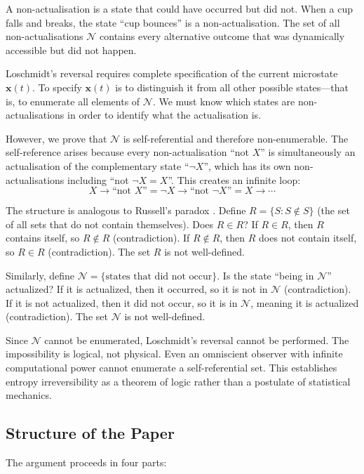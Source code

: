 \documentclass[twocolumn,10pt]{article}
\theoremstyle{definition}
\theoremstyle{remark}
\begin{document}
A non-actualisation is a state that could have occurred but did not. When a cup falls and breaks, the state ``cup bounces'' is a non-actualisation. The set of all non-actualisations $\mathcal{N}$ contains every alternative outcome that was dynamically accessible but did not happen.

Loschmidt's reversal requires complete specification of the current microstate $\mathbf{x}(t)$. To specify $\mathbf{x}(t)$ is to distinguish it from all other possible states—that is, to enumerate all elements of $\mathcal{N}$. We must know which states are non-actualisations in order to identify what the actualisation is.

However, we prove that $\mathcal{N}$ is self-referential and therefore non-enumerable. The self-reference arises because every non-actualisation ``not $X$'' is simultaneously an actualisation of the complementary state ``$\neg X$'', which has its own non-actualisations including ``not $\neg X = X$''. This creates an infinite loop:
$$
X \to \text{``not } X\text{''} = \neg X \to \text{``not } \neg X\text{''} = X \to \cdots
$$

The structure is analogous to Russell's paradox \cite{russell1903}. Define $R = \{S : S \notin S\}$ (the set of all sets that do not contain themselves). Does $R \in R$? If $R \in R$, then $R$ contains itself, so $R \notin R$ (contradiction). If $R \notin R$, then $R$ does not contain itself, so $R \in R$ (contradiction). The set $R$ is not well-defined.

Similarly, define $\mathcal{N} = \{\text{states that did not occur}\}$. Is the state ``being in $\mathcal{N}$'' actualized? If it is actualized, then it occurred, so it is not in $\mathcal{N}$ (contradiction). If it is not actualized, then it did not occur, so it is in $\mathcal{N}$, meaning it is actualized (contradiction). The set $\mathcal{N}$ is not well-defined.

Since $\mathcal{N}$ cannot be enumerated, Loschmidt's reversal cannot be performed. The impossibility is logical, not physical. Even an omniscient observer with infinite computational power cannot enumerate a self-referential set. This establishes entropy irreversibility as a theorem of logic rather than a postulate of statistical mechanics.

\subsection{Structure of the Paper}

The argument proceeds in four parts:
\end{document}
